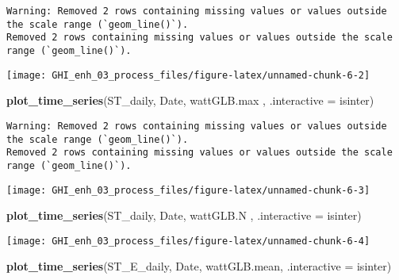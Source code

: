 \documentclass[
  10pt,
  a4paper,oneside]{article}
\newenvironment{Shaded}{\begin{snugshade}}{\end{snugshade}}
\newcommand{\AttributeTok}[1]{\textcolor[rgb]{0.13,0.29,0.53}{#1}}
\newcommand{\FunctionTok}[1]{\textcolor[rgb]{0.13,0.29,0.53}{\textbf{#1}}}
\newcommand{\NormalTok}[1]{#1}
\begin{document}
\begin{verbatim}
Warning: Removed 2 rows containing missing values or values outside the scale range (`geom_line()`).
Removed 2 rows containing missing values or values outside the scale range (`geom_line()`).
\end{verbatim}

\begin{center}\texttt{[image: GHI\_enh\_03\_process\_files/figure-latex/unnamed-chunk-6-2]} \end{center}

\begin{Shaded}
\begin{Highlighting}[]
\FunctionTok{plot\_time\_series}\NormalTok{(ST\_daily, Date, wattGLB.max , }\AttributeTok{.interactive =}\NormalTok{ isinter)}
\end{Highlighting}
\end{Shaded}

\begin{verbatim}
Warning: Removed 2 rows containing missing values or values outside the scale range (`geom_line()`).
Removed 2 rows containing missing values or values outside the scale range (`geom_line()`).
\end{verbatim}

\begin{center}\texttt{[image: GHI\_enh\_03\_process\_files/figure-latex/unnamed-chunk-6-3]} \end{center}

\begin{Shaded}
\begin{Highlighting}[]
\FunctionTok{plot\_time\_series}\NormalTok{(ST\_daily, Date, wattGLB.N   , }\AttributeTok{.interactive =}\NormalTok{ isinter)}
\end{Highlighting}
\end{Shaded}

\begin{center}\texttt{[image: GHI\_enh\_03\_process\_files/figure-latex/unnamed-chunk-6-4]} \end{center}

\begin{Shaded}
\begin{Highlighting}[]
\FunctionTok{plot\_time\_series}\NormalTok{(ST\_E\_daily, Date, wattGLB.mean, }\AttributeTok{.interactive =}\NormalTok{ isinter)}
\end{Highlighting}
\end{Shaded}
\end{document}
